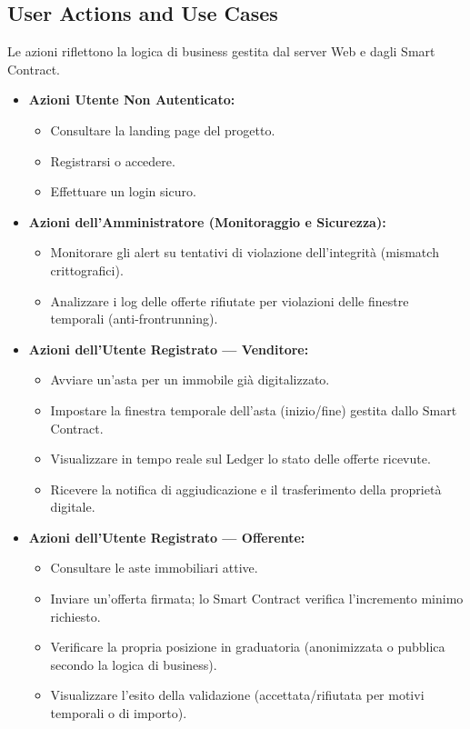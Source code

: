 \subsection*{User Actions and Use Cases}
Le azioni riflettono la logica di business gestita dal server Web e dagli Smart Contract.

\begin{itemize}
    \item \textbf{Azioni Utente Non Autenticato:}
    \begin{itemize}
        \item Consultare la landing page del progetto.
        \item Registrarsi o accedere.
        \item Effettuare un login sicuro.
    \end{itemize}

    \item \textbf{Azioni dell'Amministratore (Monitoraggio e Sicurezza):}
    \begin{itemize}
        \item Monitorare gli alert su tentativi di violazione dell'integrità (mismatch crittografici).
        \item Analizzare i log delle offerte rifiutate per violazioni delle finestre temporali (anti-frontrunning).
    \end{itemize}
    
    \item \textbf{Azioni dell'Utente Registrato — Venditore:}
    \begin{itemize}
        \item Avviare un'asta per un immobile già digitalizzato.
        \item Impostare la finestra temporale dell'asta (inizio/fine) gestita dallo Smart Contract.
        \item Visualizzare in tempo reale sul Ledger lo stato delle offerte ricevute.
        \item Ricevere la notifica di aggiudicazione e il trasferimento della proprietà digitale.
    \end{itemize}

    \item \textbf{Azioni dell'Utente Registrato — Offerente:}
    \begin{itemize}
        \item Consultare le aste immobiliari attive.
        \item Inviare un'offerta firmata; lo Smart Contract verifica l'incremento minimo richiesto.
        \item Verificare la propria posizione in graduatoria (anonimizzata o pubblica secondo la logica di business).
        \item Visualizzare l'esito della validazione (accettata/rifiutata per motivi temporali o di importo).
    \end{itemize}
\end{itemize}


